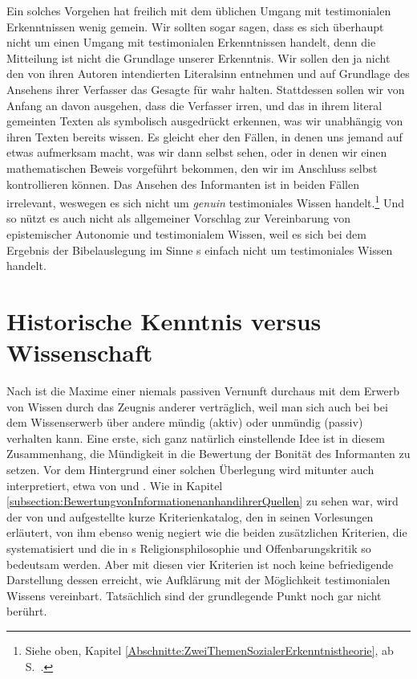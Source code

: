 Ein solches Vorgehen hat freilich mit dem üblichen Umgang mit
testimonialen Erkenntnissen wenig gemein. Wir sollten sogar sagen, dass es sich
überhaupt nicht um einen Umgang mit testimonialen Erkenntnissen handelt, denn
die Mitteilung ist nicht die Grundlage unserer Erkenntnis. Wir sollen den
 ja nicht den von ihren Autoren intendierten
Literalsinn entnehmen und auf Grundlage des Ansehens ihrer Verfasser das
Gesagte für wahr halten. Stattdessen sollen wir von Anfang an davon ausgehen,
dass die Verfasser irren, und das in ihrem literal gemeinten Texten als
symbolisch ausgedrückt erkennen, was wir unabhängig von ihren Texten bereits
wissen. Es gleicht eher den Fällen, in denen uns jemand auf etwas aufmerksam
macht, was wir dann selbst sehen, oder in denen wir einen mathematischen Beweis vorgeführt
bekommen, den wir im Anschluss selbst kontrollieren können. Das Ansehen des
Informanten ist in beiden Fällen irrelevant, weswegen es sich nicht um
\emph{genuin} testimoniales Wissen handelt.\footnote{Siehe oben, Kapitel
\ref{Abschnitte:ZweiThemenSozialerErkenntnistheorie}, ab
S.~\pageref{Abschnitte:ZweiThemenSozialerErkenntnistheorie}.} Und so nützt es
auch nicht als allgemeiner Vorschlag zur Vereinbarung von epistemischer
Autonomie und testimonialem Wissen, weil es sich bei dem Ergebnis der
Bibelauslegung im Sinne s einfach nicht um testimoniales
Wissen handelt.

\section{Historische Kenntnis versus
Wissenschaft}\label{subsection:BewertungvonInformationennachihrerART}

Nach  ist die Maxime einer niemals passiven Vernunft
durchaus mit dem Erwerb von Wissen durch das Zeugnis anderer verträglich, weil
man sich auch bei bei dem Wissenserwerb über andere mündig (aktiv) oder unmündig
(passiv) verhalten kann. Eine erste, sich ganz natürlich einstellende Idee ist
in diesem Zusammenhang, die Mündigkeit in die Bewertung der Bonität des
Informanten zu setzen. Vor dem Hintergrund einer solchen Überlegung wird
mitunter auch  interpretiert, etwa von
 und
. Wie in Kapitel
\ref{subsection:BewertungvonInformationenanhandihrerQuellen} zu sehen war,
wird der von  und  aufgestellte kurze Kriterienkatalog, den
 in seinen Vorlesungen erläutert, von ihm ebenso wenig
negiert wie die beiden zusätzlichen Kriterien, die
systematisiert und die in s Religionsphilosophie und
Offenbarungskritik so bedeutsam werden. Aber mit diesen vier Kriterien ist noch
keine befriedigende Darstellung dessen erreicht, wie 
Aufklärung mit der Möglichkeit testimonialen Wissens vereinbart. Tatsächlich
sind der grundlegende Punkt noch gar nicht berührt.

